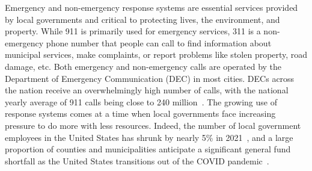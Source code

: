 Emergency and non-emergency response systems are essential services provided by local governments and critical to protecting lives, the environment, and property. While 911 is primarily used for emergency services, 311 is a non-emergency phone number that people can call to find information about municipal services, make complaints, or report problems like stolen property, road damage, etc. Both emergency and non-emergency calls are operated by the Department of Emergency Communication (DEC) in most cities. DECs across the nation receive an overwhelmingly high number of calls, with the national yearly average of 911 calls being close to 240 million~\cite{nycnextgen911, ma2019data}. The growing use of response systems comes at a time when local governments face increasing pressure to do more with less resources. Indeed, the number of local government employees in the United States has shrunk by nearly 5\% in 2021~\cite{2021annual}, and a large proportion of counties and municipalities anticipate a significant general fund shortfall as the United States transitions out of the COVID pandemic~\cite{g12afonso2021planning}. 




